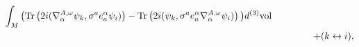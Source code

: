\documentclass[12pt]{article}
\newcommand{\nn}{\nonumber}
\def\a{\alpha}
\def\e{\epsilon}
\def\m{\mu}
\def\n{\nu}
\def\oo{\omega}
\begin{document}
\begin{eqnarray}
 \int_M \big( 
  \mbox{Tr} \left(            2i  ( \nabla^{A,\oo}_\a \psi_k, \sigma^a e_a^\a  \psi_i)    \right)   
-  \mbox{Tr} \left(      2i   (\psi_k, \sigma^a e_a^\a \nabla^{A,\oo}_\a \psi_i)   \right)
    \big)d^{(3)}\mbox{vol}
 \nn\\
&&\hspace{1,2cm} +  (k \leftrightarrow i),
\label{corona}
\end{eqnarray}
\end{document}
